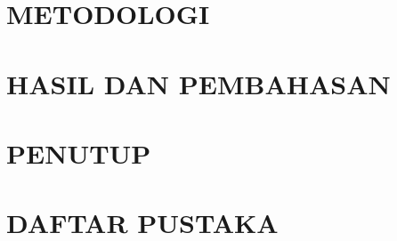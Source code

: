 \documentclass[12pt, a4paper, twoside]{book}
\begin{document}
  \chapter{METODOLOGI}
  
  
  \cleardoublepage

  \chapter{HASIL DAN PEMBAHASAN}
  
  
  
  \cleardoublepage

  \chapter{PENUTUP}
  
  
  \cleardoublepage

  \chapter*{DAFTAR PUSTAKA}
    \vspace{2ex}
  \renewcommand{\bibname}{}
  \begingroup
    \def\chapter*#1{}
    \nocite{*}
    \rmfamily\printbibliography
  \endgroup

  \cleardoublepage
  \appendix

  \renewcommand{\chaptertitlename}{Lampiran}
  \renewcommand{\thechapter}{\Alph{chapter}}

  
  
  \cleardoublepage
  
  
  \cleardoublepage
  
  \cleardoublepage
  
  \cleardoublepage
  
  \cleardoublepage
  


  \newpage
  \rmfamily
  
  
\end{document}
